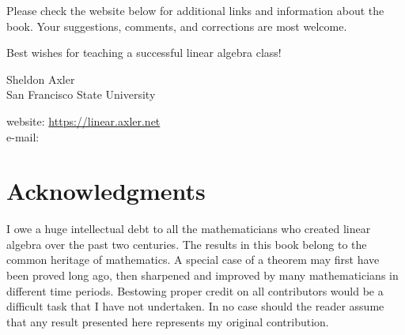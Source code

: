 Please check the website below for additional links and information about the book. Your suggestions, comments, and corrections are most welcome.

Best wishes for teaching a successful linear algebra class!

\medskip


\noindent
Sheldon Axler \\
San Francisco State University

\medskip

\noindent
website: \url{https://linear.axler.net} \\
e-mail: 

\pagebreak[3]

\section{Acknowledgments} \label{acknowledgments}

I owe a huge intellectual debt to all the mathematicians who created linear algebra over the past two centuries. The results in this book belong to the common heritage of mathematics.  A special case of a theorem may first have been proved long ago, then sharpened and improved by many mathematicians in different time periods.  Bestowing proper credit on all contributors would be a difficult task that I have not undertaken. In no case should the reader assume that any result presented here represents my original contribution.

